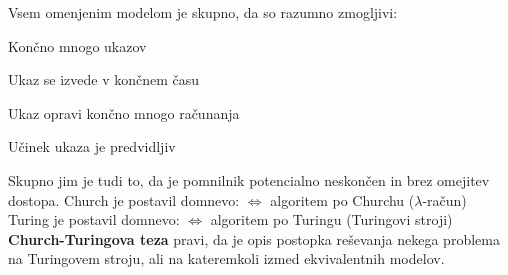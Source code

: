 \documentclass[10pt,a4paper,oneside]{book}
\begin{document}
Vsem omenjenim modelom je skupno, da so razumno zmogljivi:
\begin{items}
\item Končno mnogo ukazov
\item Ukaz se izvede v končnem času
\item Ukaz opravi končno mnogo računanja
\item Učinek ukaza je predvidljiv%
\end{items}
Skupno jim je tudi to, da je pomnilnik potencialno neskončen in brez omejitev dostopa.
Church je postavil domnevo:  $\Longleftrightarrow$ algoritem po Churchu ($\lambda$-račun)\\%
Turing je postavil domnevo:  $\Longleftrightarrow$ algoritem po Turingu (Turingovi stroji)
\br
\textbf{Church-Turingova teza} pravi, da je  opis postopka reševanja nekega problema na Turingovem stroju, ali na kateremkoli izmed ekvivalentnih modelov.%
\end{document}
